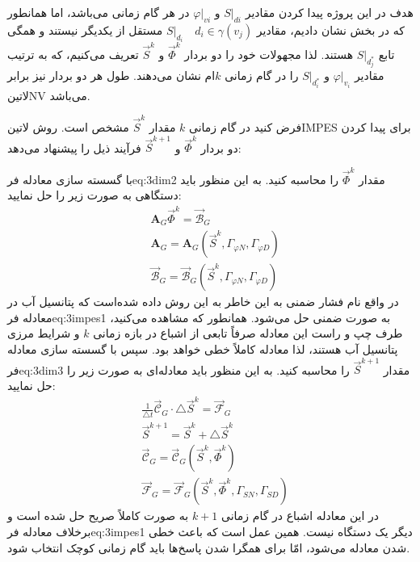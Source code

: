 هدف در این پروژه پیدا کردن مقادیر $S|_{di}$ و $\varphi|_{vi}$ در هر گام زمانی می‌باشد، اما همانطور که در  بخش   نشان دادیم، مقادیر
 $S|_{d_i} \quad d_i\in\gamma(v_j)$
 مستقل از یکدیگر نیستند و همگی تابع  $S|_{d_j^*}$  هستند. لذا مجهولات خود را دو بردار 
$\vec{\Phi}^k$ و $\vec{S}^k$
تعریف می‌کنیم، که به ترتیب مقادیر $\varphi|_{v_i}$ و $S|_{d_i^*}$ را در گام زمانی $k$ام نشان می‌دهند. طول هر دو بردار نیز برابر ‌لاتین{NV} می‌باشد.

فرض کنید در گام زمانی $k$ مقدار $\vec{S}^k$ مشخص است. روش ‌لاتین{IMPES} برای پیدا کردن دو بردار 
$\vec{\Phi}^k$ و $\vec{S}^{k+1}$
فرآیند ذیل را پیشنهاد می‌دهد:
\begin{tight_enumerate}
 با گسسته سازی معادله ‌فر{eq:3dim2} مقدار $\vec{\Phi}^k$ را محاسبه کنید. به این منظور باید دستگاهی به صورت زیر را حل نمایید:
\begin{equation}
\label{eq:3impes1}
\begin{aligned}
&\textbf{A}_G \vec{\Phi}^k = \vec{\mathcal{B}}_G \\
& \textbf{A}_G = \textbf{A}_G(\vec{S}^k, \Gamma_{\varphi N}, \Gamma_{\varphi D})\\
& \vec{\mathcal{B}}_G = \vec{\mathcal{B}}_G(\vec{S}^k, \Gamma_{\varphi N}, \Gamma_{\varphi D}) 
\end{aligned}
\end{equation}
در واقع نام فشار ضمنی به این خاطر به این روش داده شده‌است که پتانسیل آب در معادله ‌فر{eq:3impes1} به صورت ضمنی حل می‌شود. همانطور که مشاهده می‌کنید، طرف چپ و راست این معادله صرفاً تابعی از اشباع در بازه زمانی $k$ و شرایط مرزی پتانسیل آب هستند، لذا معادله کاملاً خطی خواهد بود.
 سپس با گسسته سازی معادله ‌فر{eq:3dim3} مقدار $\vec{S}^{k+1}$ را محاسبه کنید. به این منظور باید معادله‌ای به صورت زیر را حل نمایید:
\begin{equation}
\label{eq:3impes2}
\begin{aligned}
&\frac{1}{\triangle t} \vec{\mathcal C}_G \cdot \triangle\vec S^k = \vec{\mathcal{F}}_G \\
&\vec{S}^{k+1} =  \vec{S}^{k} + \triangle\vec{S}^{k} \\
& \vec{\mathcal C}_G = \vec{\mathcal C}_G(\vec{S}^k,\vec{\Phi}^k)\\
& \vec{\mathcal F }_G = \vec{\mathcal{F}}_G(\vec{S}^k,\vec{\Phi}^k, \Gamma_{SN}, \Gamma_{SD}) 
\end{aligned}
\end{equation}
در این معادله اشباع در گام زمانی $k+1$ به صورت کاملاً صریح حل شده است و برخلاف معادله ‌فر{eq:3impes1} دیگر یک دستگاه نیست. همین عمل است که باعث خطی شدن معادله می‌شود، امّا برای همگرا شدن پاسخ‌ها باید گام زمانی کوچک انتخاب شود. 
\end{tight_enumerate}

